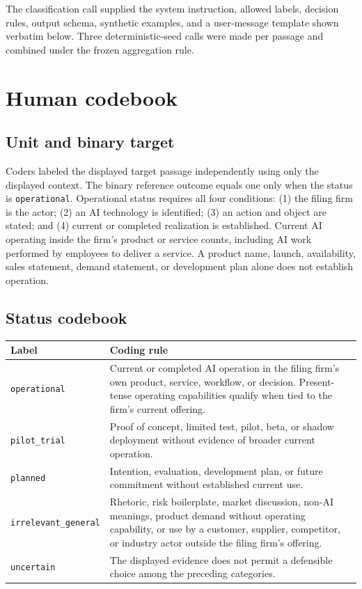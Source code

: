\documentclass[11pt]{article}
\begin{document}
The classification call supplied the system instruction, allowed labels,
decision rules, output schema, synthetic examples, and a user-message
template shown verbatim below. Three deterministic-seed calls were made per
passage and combined under the frozen aggregation rule.


\section{Human codebook}

\subsection{Unit and binary target}

Coders labeled the displayed target passage independently using only the
displayed context. The binary reference outcome equals one only when the
status is \texttt{operational}. Operational status requires all four
conditions: (1) the filing firm is the actor; (2) an AI technology is
identified; (3) an action and object are stated; and (4) current or completed
realization is established. Current AI operating inside the firm's product or
service counts, including AI work performed by employees to deliver a service.
A product name, launch, availability, sales statement, demand statement, or
development plan alone does not establish operation.

\subsection{Status codebook}

\begin{longtable}{@{}p{}p{}@{}}
\toprule
Label & Coding rule \\
\midrule
\endhead
\texttt{operational} & Current or completed AI operation in the filing
firm's own product, service, workflow, or decision. Present-tense operating
capabilities qualify when tied to the firm's current offering. \\
\texttt{pilot\_trial} & Proof of concept, limited test, pilot, beta, or
shadow deployment without evidence of broader current operation. \\
\texttt{planned} & Intention, evaluation, development plan, or future
commitment without established current use. \\
\texttt{irrelevant\_general} & Rhetoric, risk boilerplate, market discussion,
non-AI meanings, product demand without operating capability, or use by a
customer, supplier, competitor, or industry actor outside the filing firm's
offering. \\
\texttt{uncertain} & The displayed evidence does not permit a defensible
choice among the preceding categories. \\
\bottomrule
\end{longtable}
\end{document}
